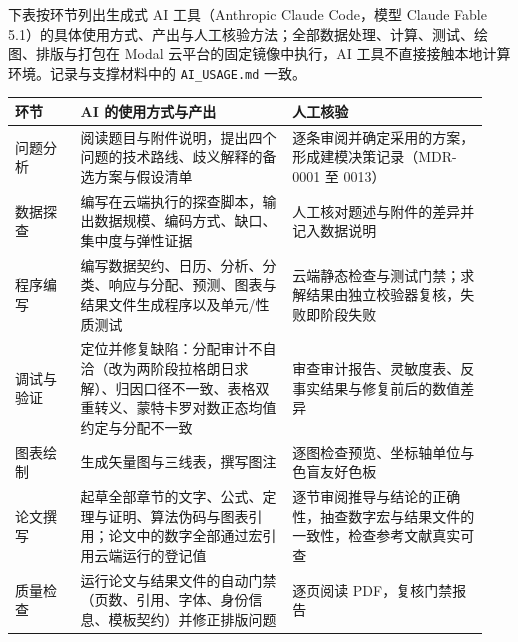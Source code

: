 下表按环节列出生成式 AI 工具（Anthropic Claude Code，模型 Claude Fable 5.1）的具体使用方式、产出与人工核验方法；全部数据处理、计算、测试、绘图、排版与打包在 Modal 云平台的固定镜像中执行，AI 工具不直接接触本地计算环境。记录与支撑材料中的 \nolinkurl{AI_USAGE.md} 一致。

\begin{longtable}{@{}p{0.13\linewidth}p{0.42\linewidth}p{0.39\linewidth}@{}}
\toprule 环节 & AI 的使用方式与产出 & 人工核验 \\ \midrule \endhead \bottomrule \endfoot
问题分析 & 阅读题目与附件说明，提出四个问题的技术路线、歧义解释的备选方案与假设清单 & 逐条审阅并确定采用的方案，形成建模决策记录（MDR-0001 至 0013） \\
数据探查 & 编写在云端执行的探查脚本，输出数据规模、编码方式、缺口、集中度与弹性证据 & 人工核对题述与附件的差异并记入数据说明 \\
程序编写 & 编写数据契约、日历、分析、分类、响应与分配、预测、图表与结果文件生成程序以及单元/性质测试 & 云端静态检查与测试门禁；求解结果由独立校验器复核，失败即阶段失败 \\
调试与验证 & 定位并修复缺陷：分配审计不自洽（改为两阶段拉格朗日求解）、归因口径不一致、表格双重转义、蒙特卡罗对数正态均值约定与分配不一致 & 审查审计报告、灵敏度表、反事实结果与修复前后的数值差异 \\
图表绘制 & 生成矢量图与三线表，撰写图注 & 逐图检查预览、坐标轴单位与色盲友好色板 \\
论文撰写 & 起草全部章节的文字、公式、定理与证明、算法伪码与图表引用；论文中的数字全部通过宏引用云端运行的登记值 & 逐节审阅推导与结论的正确性，抽查数字宏与结果文件的一致性，检查参考文献真实可查 \\
质量检查 & 运行论文与结果文件的自动门禁（页数、引用、字体、身份信息、模板契约）并修正排版问题 & 逐页阅读 PDF，复核门禁报告 \\
\end{longtable}
